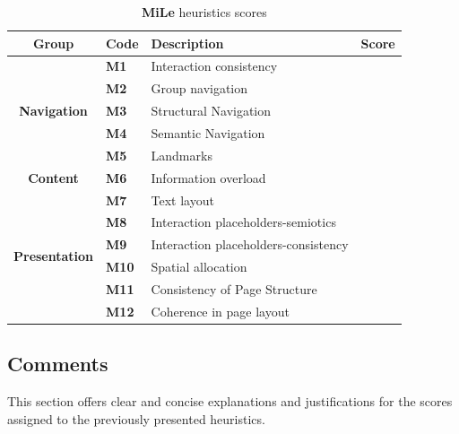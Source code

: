 \begin{table}[htp!]
	\centering
	\begin{tabular}{ |c|l|l|c| }
		\hline
		\textbf{Group} & \textbf{Code} & \textbf{Description} & \textbf{Score}\\
		\hline
		\multirow{5}{*}{\textbf{Navigation}} & \textbf{M1} & Interaction consistency & \textbf{\color{unicefGreen}{4}}\\
		\cline{2-4}
		& \textbf{M2} & Group navigation & \textbf{\color{unicefGreen}{4}}\\
		\cline{2-4}
		& \textbf{M3} & Structural Navigation & \textbf{\color{unicefGreen}{4}}\\
		\cline{2-4}
		& \textbf{M4} & Semantic Navigation & \textbf{\color{unicefGreen}{5}}\\
		\cline{2-4}
		& \textbf{M5} & Landmarks & \textbf{\color{unicefGreen}{4}}\\
		\hline
		\textbf{Content} & \textbf{M6} & Information overload & \textbf{\color{unicefGreen}{4}}\\
		\hline
		\multirow{6}{*}{\textbf{Presentation}} & \textbf{M7} & Text layout & \textbf{\color{unicefGreen}{5}}\\
		\cline{2-4}
		& \textbf{M8} & Interaction placeholders-semiotics & \textbf{\color{unicefGreen}{4}}\\
		\cline{2-4}
		& \textbf{M9} & Interaction placeholders-consistency & \textbf{\color{unicefGreen}{4}}\\
		\cline{2-4}
		& \textbf{M10} & Spatial allocation & \textbf{\color{unicefGreen}{4}}\\
		\cline{2-4}
		& \textbf{M11} & Consistency of Page Structure & \textbf{\color{unicefGreen}{4}}\\
		\cline{2-4}
		& \textbf{M12} & Coherence in page layout & \textbf{\color{unicefGreen}{5}}\\
		\hline
	\end{tabular}
	\caption{\textbf{MiLe} heuristics scores}
\end{table}
\newpage
\subsection{Comments}
This section offers clear and concise explanations and justifications for the scores assigned to the previously presented heuristics.
